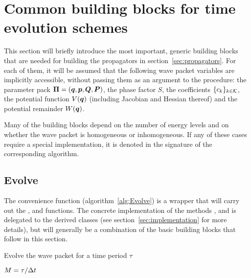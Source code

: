 \clearpage
\section{Common building blocks for time evolution schemes}
%
This section will briefly introduce the most important, generic building blocks that are needed for building the propagators in section~\ref{sec:propagators}.
For each of them, it will be assumed that the following wave packet variables are implicitly accessible, without passing them as an argument to the procedure: the parameter pack $\bm{\Pi} = (\bm{q},\bm{p},\bm{Q},\bm{P})$, the phase factor $S$, the coefficients $\{ c_k \}_{k \in \mathcal{K}}$, the potential function $V(\bm{q})$ (including Jacobian and Hessian thereof) and the potential remainder $W(\bm{q})$.
\par\medskip
%
Many of the building blocks depend on the number of energy levels and on whether the wave packet is homogeneous or inhomogeneous.
If any of these cases require a special implementation, it is denoted in the signature of the corresponding algorithm.


\subsection{Evolve}
\label{subsec:evolve}
The convenience function  (algorithm~\ref{alg:Evolve}) is a wrapper that will carry out the ,  and  functions.
The concrete implementation of the methods ,  and  is delegated to the derived classes (see section~\ref{sec:implementation} for more details),
but will generally be a combination of the basic building blocks that follow in this section.
%
\begin{algorithm}[h]
	\caption{Evolve the wave packet for a time period $\tau$}
	\label{alg:Evolve}
	\begin{algorithmic}
		\State
		\State
		\State $M = \tau/\Delta t$
		\State {}
			\State {}
		\EndFor
		\State {}
	\EndProcedure
	\State
	\end{algorithmic}
\end{algorithm}


